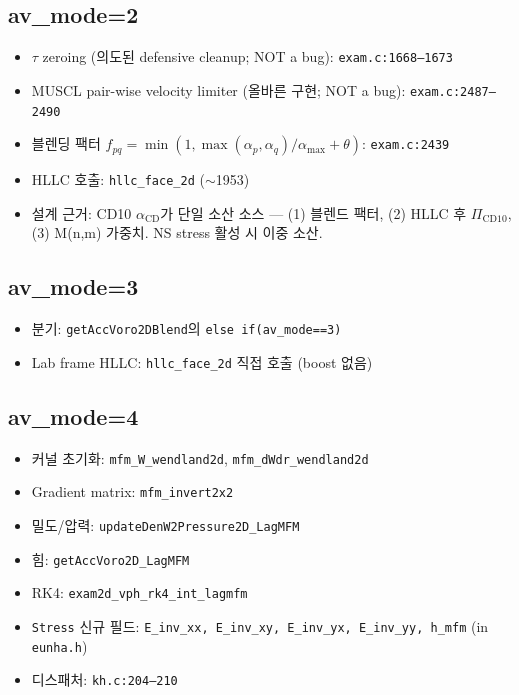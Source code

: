 \documentclass[11pt]{article}
\begin{document}
\subsection*{av\_mode=2}
\begin{itemize}
  \item $\tau$ zeroing (의도된 defensive cleanup; NOT a bug):
        \texttt{exam.c:1668--1673}
  \item MUSCL pair-wise velocity limiter (올바른 구현; NOT a bug):
        \texttt{exam.c:2487--2490}
  \item 블렌딩 팩터 $f_{pq} = \min(1, \max(\alpha_p,\alpha_q)/\alpha_{\max}+\theta)$:
        \texttt{exam.c:2439}
  \item HLLC 호출: \texttt{hllc\_face\_2d} ($\sim$1953)
  \item 설계 근거: CD10 $\alpha_\mathrm{CD}$가 단일 소산 소스
        — (1) 블렌드 팩터, (2) HLLC 후 $\Pi_\mathrm{CD10}$,
        (3) M(n,m) 가중치. NS stress 활성 시 이중 소산.
\end{itemize}

\subsection*{av\_mode=3}
\begin{itemize}
  \item 분기: \texttt{getAccVoro2DBlend}의 \texttt{else if(av\_mode==3)}
  \item Lab frame HLLC: \texttt{hllc\_face\_2d} 직접 호출 (boost 없음)
\end{itemize}

\subsection*{av\_mode=4}
\begin{itemize}
  \item 커널 초기화: \texttt{mfm\_W\_wendland2d}, \texttt{mfm\_dWdr\_wendland2d}
  \item Gradient matrix: \texttt{mfm\_invert2x2}
  \item 밀도/압력: \texttt{updateDenW2Pressure2D\_LagMFM}
  \item 힘: \texttt{getAccVoro2D\_LagMFM}
  \item RK4: \texttt{exam2d\_vph\_rk4\_int\_lagmfm}
  \item \texttt{Stress} 신규 필드: \texttt{E\_inv\_xx, E\_inv\_xy, E\_inv\_yx, E\_inv\_yy, h\_mfm} (in \texttt{eunha.h})
  \item 디스패처: \texttt{kh.c:204--210}
\end{itemize}
\end{document}
